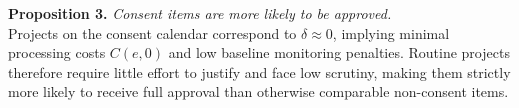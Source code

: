 \textbf{Proposition 3.} \textit{Consent items are more likely to be approved.}\\

Projects on the consent calendar correspond to $\delta \approx 0$, implying minimal processing costs $C(e,0)$ and low baseline monitoring penalties. Routine projects therefore require little effort to justify and face low scrutiny, making them strictly more likely to receive full approval than otherwise comparable non-consent items.\\